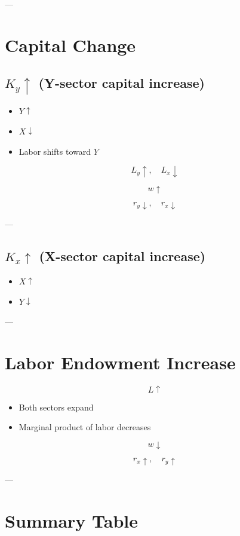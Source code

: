 ---

\section{Capital Change}

\subsection{$K_y \uparrow$ (Y-sector capital increase)}

\begin{itemize}
    \item $Y \uparrow$
    \item $X \downarrow$
    \item Labor shifts toward $Y$
\end{itemize}

\[
L_y \uparrow, \quad L_x \downarrow
\]

\[
w \uparrow
\]

\[
r_y \downarrow, \quad r_x \downarrow
\]

---

\subsection{$K_x \uparrow$ (X-sector capital increase)}

\begin{itemize}
    \item $X \uparrow$
    \item $Y \downarrow$
\end{itemize}

---

\section{Labor Endowment Increase}

\[
L \uparrow
\]

\begin{itemize}
    \item Both sectors expand
    \item Marginal product of labor decreases
\end{itemize}

\[
w \downarrow
\]

\[
r_x \uparrow, \quad r_y \uparrow
\]

---

\section{Summary Table}

